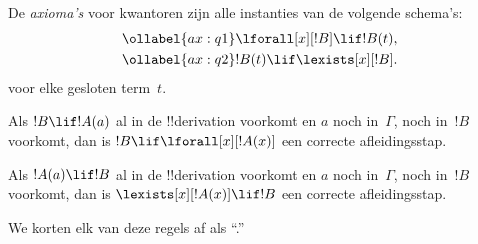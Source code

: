 \documentclass[../../../include/open-logic-section]{subfiles}
\begin{document}


\begin{defn}
De \emph{axioma's} voor kwantoren zijn alle instanties van de volgende
schema's:
\begin{align}
\ollabel{ax:q1} & \lforall[x][!B] \lif !B(t), \\
\ollabel{ax:q2} & !B(t) \lif \lexists[x][!B].
\end{align}
voor elke gesloten term~$t$.
\end{defn}

\begin{defn}
\item Als $!B \lif !A(a)$ al in de !!{derivation} voorkomt en $a$
  noch in~$\Gamma$, noch in~$!B$ voorkomt, dan is $!B \lif
  \lforall[x][!A(x)]$ een correcte afleidingsstap.
\item Als $!A(a) \lif !B$ al in de !!{derivation} voorkomt en $a$
  noch in~$\Gamma$, noch in~$!B$ voorkomt, dan is
  $\lexists[x][!A(x)] \lif !B$ een correcte afleidingsstap.
\end{defn}

We korten elk van deze regels af als ``\QR.''
\end{document}
